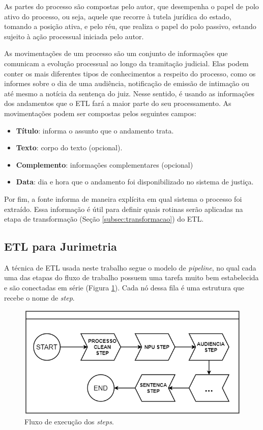 As partes do processo são compostas pelo autor, que desempenha o papel de polo ativo do processo, ou seja, aquele que recorre à tutela jurídica do estado, tomando a posição ativa, e pelo réu, que realiza o papel do polo passivo, estando sujeito à ação processual iniciada pelo autor.

As movimentações de um processo são um conjunto de informações que comunicam a evolução processual ao longo da tramitação judicial. Elas podem conter os mais diferentes tipos de conhecimentos a respeito do processo, como os informes sobre o dia de uma audiência, notificação de emissão de intimação ou até mesmo a notícia da sentença do juiz. Nesse sentido, é usando as informações dos andamentos que o ETL fará a maior parte do seu processamento. As movimentações podem ser compostas pelos seguintes campos: 

\begin{itemize}
    \item \textbf{Título}: informa o assunto que o andamento trata.
    \item \textbf{Texto}: corpo do texto (opcional).
    \item \textbf{Complemento}: informações complementares (opcional)
    \item \textbf{Data}: dia e hora que o andamento foi disponibilizado no sistema de justiça.
\end{itemize}

Por fim, a fonte informa de maneira explícita em qual sistema o processo foi extraído. Essa informação é útil para definir quais rotinas serão aplicadas na etapa de transformação (Seção \ref{subsec:transformacao}) do ETL.


\subsection{ETL para Jurimetria}
\label{subsec:jurimetria}

A técnica de ETL usada neste trabalho segue o modelo de \textit{pipeline}, no qual cada uma das etapas do fluxo de trabalho possuem uma tarefa muito bem estabelecida e são conectadas em série (Figura \ref{fig:stepsFlow}). Cada nó dessa fila é uma estrutura que recebe o nome de \textit{step}.

\begin{figure}[ht]
\centering
\includegraphics[width=1\textwidth]{imagens/steps-flow.png}
\caption{Fluxo de execução dos \textit{steps}.}
\label{fig:stepsFlow}
\end{figure}


